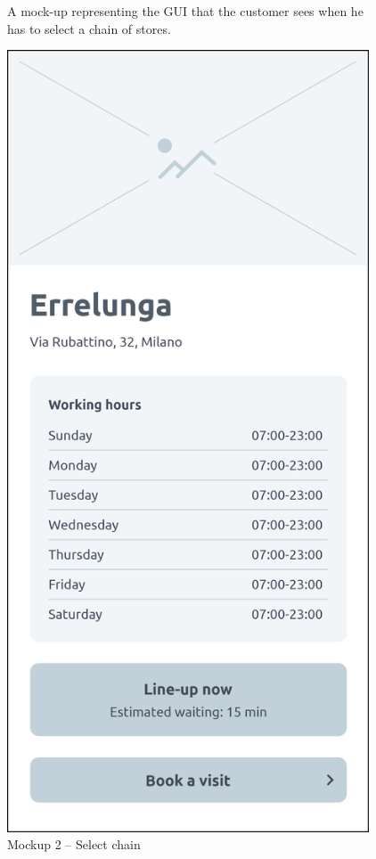 \documentclass[a4paper,oneside,11pt]{book}   %
\newcommand{\captionrasd}[2]{\caption{#1}\par\begin{center}\vspace{-.01\textheight}\small#2.\end{center}}
\begin{document}
\begin{figure}[H]
\begin{minipage}[b]{0.4\textwidth}
            \captionrasd{Mockup 2 -- Select chain}{A mock-up representing the GUI that the customer sees when he has to select a chain of stores}
        \end{minipage}
        \hspace{0.075\textwidth}
        \begin{minipage}[b]{0.418\textwidth}
            \vspace{-0.5\textheight}
            \includegraphics[width=0.958\textwidth]{pictures/mockups/store_view}

\end{minipage}
\end{figure}
\end{document}

